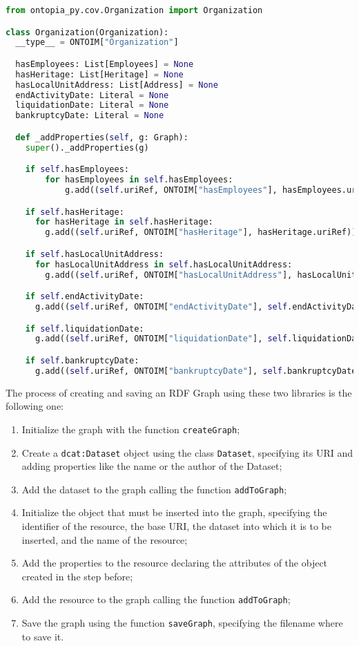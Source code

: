 \begin{lstlisting}[language=python,caption={The ontopim-py's Organization class. This class inherits the one defined in ontopia-py, declaring the new attributes.},label=code:organization-ontoim-py]
from ontopia_py.cov.Organization import Organization

class Organization(Organization):
  __type__ = ONTOIM["Organization"]

  hasEmployees: List[Employees] = None
  hasHeritage: List[Heritage] = None
  hasLocalUnitAddress: List[Address] = None
  endActivityDate: Literal = None
  liquidationDate: Literal = None
  bankruptcyDate: Literal = None

  def _addProperties(self, g: Graph):
    super()._addProperties(g)

    if self.hasEmployees:
        for hasEmployees in self.hasEmployees:
            g.add((self.uriRef, ONTOIM["hasEmployees"], hasEmployees.uriRef))

    if self.hasHeritage:
      for hasHeritage in self.hasHeritage:
        g.add((self.uriRef, ONTOIM["hasHeritage"], hasHeritage.uriRef))

    if self.hasLocalUnitAddress:
      for hasLocalUnitAddress in self.hasLocalUnitAddress:
        g.add((self.uriRef, ONTOIM["hasLocalUnitAddress"], hasLocalUnitAddress.uriRef))

    if self.endActivityDate:
      g.add((self.uriRef, ONTOIM["endActivityDate"], self.endActivityDate))

    if self.liquidationDate:
      g.add((self.uriRef, ONTOIM["liquidationDate"], self.liquidationDate))

    if self.bankruptcyDate:
      g.add((self.uriRef, ONTOIM["bankruptcyDate"], self.bankruptcyDate))
\end{lstlisting}

The process of creating and saving an \ac{RDF} Graph using these two libraries is the following one:

\begin{enumerate}
  \item Initialize the graph with the function \verb#createGraph#;
  \item Create a \verb#dcat:Dataset# object using the class \verb#Dataset#, specifying its \ac{URI} and adding properties like the name or the author of the Dataset;
  \item Add the dataset to the graph calling the function \verb#addToGraph#;
  \item Initialize the object that must be inserted into the graph, specifying the identifier of the resource, the base \ac{URI}, the dataset into which it is to be inserted, and the name of the resource;
  \item Add the properties to the resource declaring the attributes of the object created in the step before;
  \item Add the resource to the graph calling the function \verb#addToGraph#;
  \item Save the graph using the function \verb#saveGraph#, specifying the filename where to save it.
\end{enumerate}

